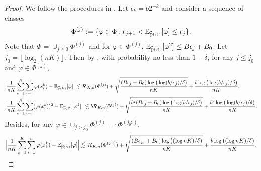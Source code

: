 \documentclass[11pt]{article}
\numberwithin{equation}{section}
\renewcommand{\P}{\mathbb{P}}
\begin{document}
\begin{proof}
    We follow the procedures in \citet{bousquet2002concentration}.
    Let $\epsilon_k=b2^{-k}$ and consider a sequence of classes
    \begin{equation}
        \Phi^{(j)}:=\{\varphi\in\Phi: \epsilon_{j+1}<\E_{\widehat{\P}^{(K)}}[\varphi] \leq \epsilon_j\}.
    \end{equation}
    Note that $\Phi=\cup_{j\geq 0}\Phi^{(j)}$ and for $\varphi\in\Phi^{(j)}$, $\E_{\widehat{\P}^{(K)}}[\varphi^2]\leq B\epsilon_j+B_0$.
    Let $j_0=\lfloor\log_2(nK)\rfloor$.
    Then by \citet[Theorem 3]{massart2000constants}, with probability no less than $1-\delta$, for any $j\leq j_0$ and $\varphi\in\Phi^{(j)}$,
    \begin{align}
        &\Big|\frac{1}{nK}\sum_{k=1}^K\sum_{i=1}^n\varphi(x_i^k)-\E_{\widehat{\P}^{(K)}}[\varphi]\Big|\lesssim \mathcal{R}_{K,n}(\Phi^{(j)})+\sqrt{\frac{(B\epsilon_j+B_0)\log\big(\log(b/\epsilon_j)/\delta\big)}{nK}} + \frac{b\log\big(\log(b/\epsilon_j)/\delta\big)}{nK}, \label{eq:rademacher_meta_1}\\
        &\Big|\frac{1}{nK}\sum_{k=1}^K\sum_{i=1}^n(\varphi(x_i^k))^2-\E_{\widehat{\P}^{(K)}}[\varphi^2]\Big|\lesssim b\mathcal{R}_{K,n}(\Phi^{(j)})+\sqrt{\frac{b^2(B\epsilon_j+B_0)\log\big(\log(b/\epsilon_j)/\delta\big)}{nK}} + \frac{b^2\log\big(\log(b/\epsilon_j)/\delta\big)}{nK}. \label{eq:rademacher_meta_2}
    \end{align}
    Besides, for any $\varphi\in\cup_{j>j_0}\Phi^{(j)}=:\Phi^{(j_0:)}$,
    \begin{equation}\label{eq:rademacher_meta_3}
        \Big|\frac{1}{nK}\sum_{k=1}^K\sum_{i=1}^n\varphi(x_i^k)-\E_{\widehat{\P}^{(K)}}[\varphi]\Big|\lesssim \mathcal{R}_{K,n}(\Phi^{(j_0:)})+\sqrt{\frac{(B\epsilon_{j_0}+B_0)\log\big((\log nK)/\delta\big)}{nK}} + \frac{b\log\big( (\log nK)/\delta\big)}{nK}.
    \end{equation}
    

\end{proof}
\end{document}
